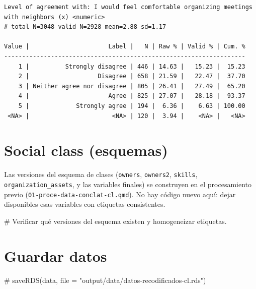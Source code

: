 \documentclass[
  letterpaper,
  DIV=11,
  numbers=noendperiod]{scrreprt}
\newenvironment{Shaded}{\begin{snugshade}}{\end{snugshade}}
\newcommand{\CommentTok}[1]{\textcolor[rgb]{0.37,0.37,0.37}{#1}}
\begin{document}
\begin{verbatim}
Level of agreement with: I would feel comfortable organizing meetings with neighbors (x) <numeric> 
# total N=3048 valid N=2928 mean=2.88 sd=1.17

Value |                      Label |   N | Raw % | Valid % | Cum. %
-------------------------------------------------------------------
    1 |          Strongly disagree | 446 | 14.63 |   15.23 |  15.23
    2 |                   Disagree | 658 | 21.59 |   22.47 |  37.70
    3 | Neither agree nor disagree | 805 | 26.41 |   27.49 |  65.20
    4 |                      Agree | 825 | 27.07 |   28.18 |  93.37
    5 |             Strongly agree | 194 |  6.36 |    6.63 | 100.00
 <NA> |                       <NA> | 120 |  3.94 |    <NA> |   <NA>
\end{verbatim}

\section{Social class (esquemas)}\label{social-class-esquemas}

Las versiones del esquema de clases (\texttt{owners}, \texttt{owners2},
\texttt{skills}, \texttt{organization\_assets}, y las variables finales)
se construyen en el procesamiento previo
(\texttt{01-proce-data-conclat-cl.qmd}). No hay código nuevo aquí: dejar
disponibles esas variables con etiquetas consistentes.

\begin{Shaded}
\begin{Highlighting}[]
\CommentTok{\# Verificar qué versiones del esquema existen y homogeneizar etiquetas.}
\end{Highlighting}
\end{Shaded}

\section{Guardar datos}\label{guardar-datos}

\begin{Shaded}
\begin{Highlighting}[]
\CommentTok{\# saveRDS(data, file = "output/data/datos{-}recodificados{-}cl.rds")}
\end{Highlighting}
\end{Shaded}
\end{document}
